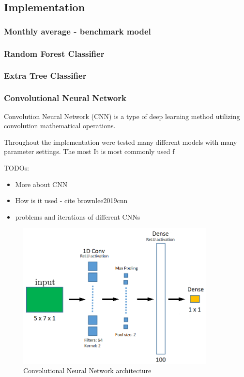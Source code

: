 \documentclass{article}
\begin{document}
\subsection{Implementation}

\subsubsection{Monthly average - benchmark model}


\subsubsection{Random Forest Classifier}
\subsubsection{Extra Tree Classifier}
\subsubsection{Convolutional Neural Network}
Convolution Neural Network (CNN) is a type of deep learning method utilizing convolution mathematical operations. 

Throughout the implementation were tested many different models with many parameter settings. The most 
It is most commonly used f

\color{red}
TODOs:
\begin{itemize}
    \item More about CNN
    \item How is it used - cite brownlee2019cnn
    \item problems and iterations of different CNNs
\end{itemize}
\color{black}

\begin{figure}[h!]
\centering
\includegraphics[width=10cm]{imgs/cnn}
\caption{Convolutional Neural Network architecture}
\label{fig:cnn}
\end{figure}
\end{document}
